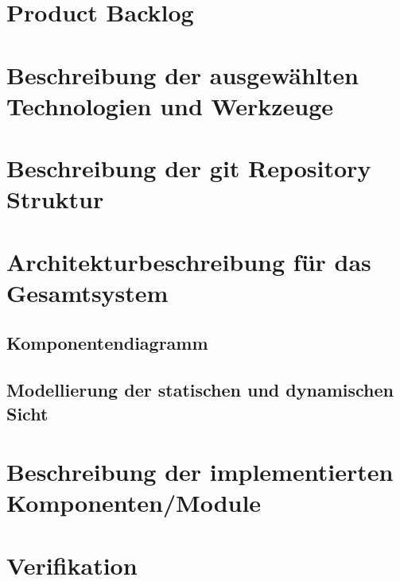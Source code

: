 
\section{Product Backlog}
\label{sec:backlog}


\section{Beschreibung der ausgewählten Technologien und Werkzeuge}
\label{sec:technologien_wekzeuge}


\section{Beschreibung der git Repository Struktur}
\label{sec:git}


\section{Architekturbeschreibung für das Gesamtsystem}
\label{sec:architektur}


    \subsection{Komponentendiagramm}
    \label{subsec:komponentendiagramm}
    

    \subsection{Modellierung der statischen und dynamischen Sicht}
    \label{subsec:statische_und_dynamische_sicht}
    

\section{Beschreibung der implementierten Komponenten/Module}
\label{sec:implementierte_komponenten}


\section{Verifikation}
\label{sec:verifikation}


